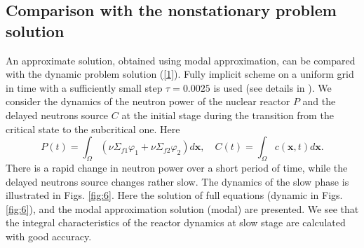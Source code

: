 \documentclass[a4paper]{jpconf}
\begin{document}
\subsection{Comparison with the nonstationary problem solution} 
An approximate solution, obtained using modal approximation, can be compared with the dynamic problem solution (\ref{1}). 
Fully implicit scheme on a uniform grid in time with a sufficiently small step $\tau = 0.0025$ is used (see details in \cite{nd-mm}).
We consider the dynamics of the neutron power of the nuclear reactor $P$ and the delayed neutrons source $C$ at the initial stage during the transition from the critical state to the subcritical one. 
Here 
\[
 P(t) = \int_{\Omega} (\nu\Sigma_{f1} \varphi_1 + \nu\Sigma_{f2} \varphi_2)  d \bm x,
 \quad C(t) = \int_{\Omega} c(\bm x,t) d \bm x.
\] 
There is a rapid change in neutron power over a short period of time, while the delayed neutrons source changes rather slow. The dynamics of the slow phase is illustrated in Figs. \ref{fig:6}. 
Here the solution of full equations (dynamic in Figs. \ref{fig:6}), and the modal approximation solution (modal) are presented. We see that the integral characteristics of the reactor dynamics at slow stage are calculated with good accuracy.
\end{document}
